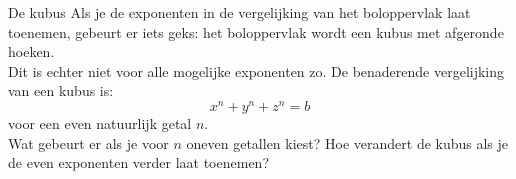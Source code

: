 \begin{surferPage}[Kubus]{De kubus}
Als je de exponenten in de vergelijking van het boloppervlak laat toenemen, gebeurt er iets geks: het boloppervlak wordt een kubus met afgeronde hoeken.\\
\vspace{0.3cm}
Dit is echter niet voor alle mogelijke exponenten zo. De benaderende vergelijking van een kubus is:
\[x^n+y^n+z^n=b\]
voor een even natuurlijk getal $n$.\\
\vspace{0.3cm}
Wat gebeurt er als je voor $n$ oneven getallen kiest? Hoe verandert de kubus als je de even exponenten verder laat toenemen?
\end{surferPage}
